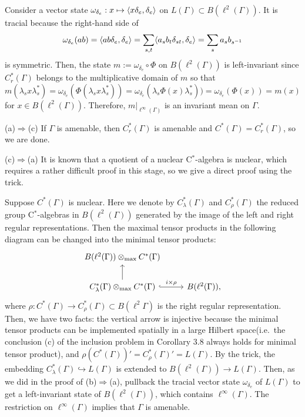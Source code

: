 \documentclass{../../small}
\begin{document}
\begin{pf}
Consider a vector state $\omega_{\delta_e}:x\mapsto\langle x\delta_e,\delta_e\rangle$ on $L(\Gamma)\subset B(\ell^2(\Gamma))$.
It is tracial because the right-hand side of
\[\omega_{\delta_e}(ab)=\langle ab\delta_e,\delta_e\rangle=\sum_{s,t}\langle a_sb_t\delta_{st},\delta_e\rangle=\sum_sa_sb_{s^{-1}}\]
is symmetric.
Then, the state $m:=\omega_{\delta_e}\circ\Phi$ on $B(\ell^2(\Gamma))$ is left-invariant since $C_r^*(\Gamma)$ belongs to the multiplicative domain of $m$ so that
\[m(\lambda_sx\lambda_s^*)=\omega_{\delta_e}(\Phi(\lambda_sx\lambda_s^*))=\omega_{\delta_e}(\lambda_s\Phi(x)\lambda_s^*))=\omega_{\delta_e}(\Phi(x))=m(x)\]
for $x\in B(\ell^2(\Gamma))$.
Therefore, $m|_{\ell^\infty(\Gamma)}$ is an invariant mean on $\Gamma$.

(a)$\Rightarrow$(c)
If $\Gamma$ is amenable, then $C_r^*(\Gamma)$ is amenable and $C^*(\Gamma)=C_r^*(\Gamma)$, so we are done.

(c)$\Rightarrow$(a)
It is known that a quotient of a nuclear C$^*$-algebra is nuclear, which requires a rather difficult proof in this stage, so we give a direct proof using the trick.

Suppose $C^*(\Gamma)$ is nuclear.
Here we denote by $C_\lambda^*(\Gamma)$ and $C_\rho^*(\Gamma)$ the reduced group C$^*$-algebras in $B(\ell^2(\Gamma))$ generated by the image of the left and right regular representations.
Then the maximal tensor products in the following diagram can be changed into the minimal tensor products:
\[\begin{tikzcd}
B(\ell^2(\Gamma))\otimes_{\max}C^*(\Gamma) &\\
C_\lambda^*(\Gamma)\otimes_{\max}C^*(\Gamma)\ar[hook]{r}{i\times\rho} \ar{u} & B(\ell^2(\Gamma)),
\end{tikzcd}\]
where $\rho:C^*(\Gamma)\to C_\rho^*(\Gamma)\subset B(\ell^2\Gamma)$ is the right regular representation.
Then, we have two facts: the vertical arrow is injective because the minimal tensor products can be implemented spatially in a large Hilbert space(i.e.~the conclusion (c) of the inclusion problem in Corollary 3.8 always holds for minimal tensor product), and $\rho(C^*(\Gamma))'=C_\rho^*(\Gamma)'=L(\Gamma)$.
By the trick, the embedding $C_\lambda^*(\Gamma)\hookrightarrow L(\Gamma)$ is extended to $B(\ell^2(\Gamma))\to L(\Gamma)$.
Then, as we did in the proof of (b)$\Rightarrow$(a), pullback the tracial vector state $\omega_{\delta_e}$ of $L(\Gamma)$ to get a left-invariant state of $B(\ell^2(\Gamma))$, which contains $\ell^\infty(\Gamma)$.
The restriction on $\ell^\infty(\Gamma)$ implies that $\Gamma$ is amenable.
\end{pf}
\end{document}
